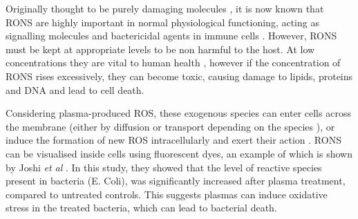 \documentclass[11pt, oneside]{article}   	%
\begin{document}
Originally thought to be purely damaging molecules \cite{Harman1955aging}, it is now known that RONS are highly important in normal physiological functioning, acting as signalling molecules and bactericidal agents in immune cells \cite{Thannickal2000reactive}.
However, RONS must be kept at appropriate levels to be non harmful to the host.
At low concentrations they are vital to human health \cite{Fang2004antimicrobial}, however if the concentration of RONS rises excessively, they can become toxic, causing damage to lipids, proteins and DNA \cite{PhamHuy2008free} and lead to cell death.

%
Considering plasma-produced ROS, these exogenous species can enter cells across the membrane (either by diffusion or transport depending on the species \cite{Bienert2006membrane}), or induce the formation of new ROS intracellularly and exert their action \cite{Haertel2014nonthermal}.
RONS can be visualised inside cells using fluorescent dyes, an example of which is shown by Joshi \textit{et al} \cite{Joshi2011nonthermal}.
In this study, they showed that the level of reactive species present in bacteria (E. Coli), was significantly increased after plasma treatment, compared to untreated controls.
This suggests plasmas can induce oxidative stress in the treated bacteria, which can lead to bacterial death.
\end{document}

